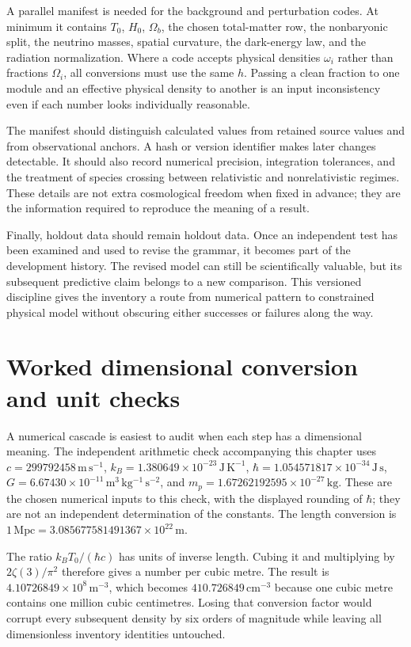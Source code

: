A parallel manifest is needed for the background and perturbation codes. At minimum it contains $T_0$, $H_0$, $\Omega_b$, the chosen total-matter row, the nonbaryonic split, the neutrino masses, spatial curvature, the dark-energy law, and the radiation normalization. Where a code accepts physical densities $\omega_i$ rather than fractions $\Omega_i$, all conversions must use the same $h$. Passing a clean fraction to one module and an effective physical density to another is an input inconsistency even if each number looks individually reasonable.

The manifest should distinguish calculated values from retained source values and from observational anchors. A hash or version identifier makes later changes detectable. It should also record numerical precision, integration tolerances, and the treatment of species crossing between relativistic and nonrelativistic regimes. These details are not extra cosmological freedom when fixed in advance; they are the information required to reproduce the meaning of a result.

Finally, holdout data should remain holdout data. Once an independent test has been examined and used to revise the grammar, it becomes part of the development history. The revised model can still be scientifically valuable, but its subsequent predictive claim belongs to a new comparison. This versioned discipline gives the inventory a route from numerical pattern to constrained physical model without obscuring either successes or failures along the way.

\section{Worked dimensional conversion and unit checks}
A numerical cascade is easiest to audit when each step has a dimensional meaning. The independent arithmetic check accompanying this chapter uses $c=299792458\,\mathrm{m\,s^{-1}}$, $k_B=1.380649\times10^{-23}\,\mathrm{J\,K^{-1}}$, $\hbar=1.054571817\times10^{-34}\,\mathrm{J\,s}$, $G=6.67430\times10^{-11}\,\mathrm{m^3\,kg^{-1}\,s^{-2}}$, and $m_p=1.67262192595\times10^{-27}\,\mathrm{kg}$. These are the chosen numerical inputs to this check, with the displayed rounding of $\hbar$; they are not an independent determination of the constants. The length conversion is $1\,\mathrm{Mpc}=3.085677581491367\times10^{22}\,\mathrm m$.

The ratio $k_BT_0/(\hbar c)$ has units of inverse length. Cubing it and multiplying by $2\zeta(3)/\pi^2$ therefore gives a number per cubic metre. The result is $4.10726849\times10^8\,\mathrm{m^{-3}}$, which becomes $410.726849\,\mathrm{cm^{-3}}$ because one cubic metre contains one million cubic centimetres. Losing that conversion factor would corrupt every subsequent density by six orders of magnitude while leaving all dimensionless inventory identities untouched.

